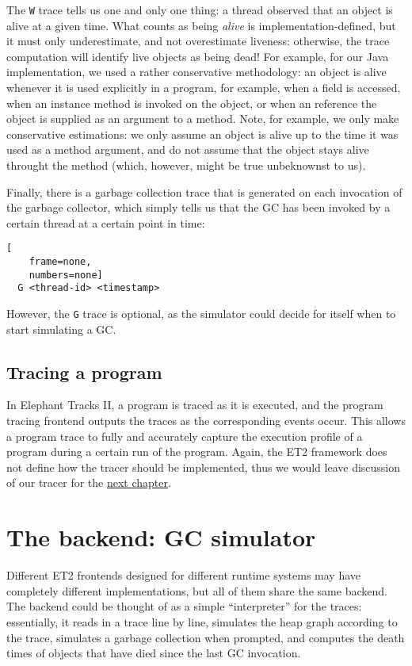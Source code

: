 The \lstinline{W} trace tells us one and only one thing: a thread observed that an object is alive at a given time. What counts as being \emph{alive}
is implementation-defined, but it must only underestimate, and not overestimate liveness: otherwise, the trace computation will identify live objects
as being dead! For example, for our Java implementation, we used a rather conservative methodology: an object is alive whenever it is used explicitly in a
program, for example, when a field is accessed, when an instance method is invoked on the object, or when an reference the object is supplied as an
argument to a method. Note, for example, we only make conservative estimations: we only assume an object is alive up to the time it was used as a method
argument, and do not assume that the object stays alive throught the method (which, however, might be true unbeknownst to us).

Finally, there is a garbage collection trace that is generated on each invocation of the garbage collector, which simply tells us that the GC has been
invoked by a certain thread at a certain point in time:

\begin{lstlisting}[
    frame=none,
    numbers=none]
  G <thread-id> <timestamp>
\end{lstlisting}

However, the \lstinline{G} trace is optional, as the simulator could decide for itself when to start simulating a GC.

\subsection{Tracing a program}
In Elephant Tracks II, a program is traced as it is executed, and the program tracing frontend outputs the traces as the corresponding events occur. This
allows a program trace to fully and accurately capture the execution profile of a program during a certain run of the program. Again, the ET2 framework does
not define how the tracer should be implemented, thus we would leave discussion of our tracer for the \hyperref[chap:algoimp]{next chapter}. 

\section{The backend: GC simulator}
Different ET2 frontends designed for different runtime systems may have completely different implementations, but all of them share the same backend. The
backend could be thought of as a simple ``interpreter'' for the traces: essentially, it reads in a trace line by line, simulates the heap graph according
to the trace, simulates a garbage collection when prompted, and computes the death times of objects that have died since the last GC invocation.

